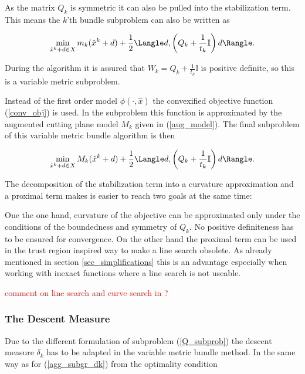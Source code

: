 As the matrix \(Q_k\) is symmetric it can also be pulled into the stabilization term. This means the \(k\)'th bundle subproblem can also be written as

\begin{equation}
	\min_{\hat{x}^k+d \in X} m_k(\hat{x}^k+d) + \frac{1}{2}\Langle d,\left(Q_k+\frac{1}{t_k}\mathbb{I} \right) d \Rangle.
\end{equation}

During the algorithm it is assured that \(W_k = Q_k+\frac{1}{t_k}\mathbb{I}\) is positive definite, so this is a variable metric subproblem.

Instead of the first order model \(\phi(\cdot,\hat{x})\) the convexified objective function (\ref{conv_obj}) is used. In the subproblem this function is approximated by the augmented cutting plane model \(M_k\) given in (\ref{aug_model}).
The final subproblem of this variable metric bundle algorithm is then

\begin{equation}
	\min_{\hat{x}^k+d \in X} M_k(\hat{x}^k+d) + \frac{1}{2}\Langle d,\left(Q_k+\frac{1}{t_k}\mathbb{I} \right) d \Rangle.
	\label{Q_subprob}
\end{equation}

The decomposition of the stabilization term into a curvature approximation and a proximal term makes is easier to reach two goals at the same time:

One the one hand, curvature of the objective can be approximated only under the conditions of the boundedness and symmetry of \(Q_k\). No positive definiteness has to be ensured for convergence.
On the other hand the proximal term can be used in the trust region inspired way to make a line search obsolete. As already mentioned in section \ref{sec_simplifications} this is an advantage especially when working with inexact functions where a line search is not useable.

\textcolor{red}{comment on line search and curve search in \cite{Lemarechal1994,Lemarechal1997,Vlcek2001}?}

\subsubsection{The Descent Measure}

Due to the different formulation of subproblem (\ref{Q_subprob}) the descent measure \(\delta_k\) has to be adapted in the variable metric bundle method.
In the same way as for (\ref{agg_subgr_dk}) from the optimality condition

